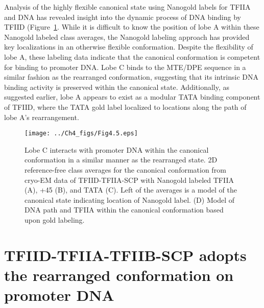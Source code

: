 \indent Analysis of the highly flexible canonical state using Nanogold labels for TFIIA and DNA has revealed insight into the dynamic process of DNA binding by TFIID (Figure~\ref{fig:Fig4.5}.  While it is difficult to know the position of lobe A within these Nanogold labeled class averages, the Nanogold labeling approach has provided key localizations in an otherwise flexible conformation. Despite the flexibility of lobe A, these labeling data indicate that the canonical conformation is competent for binding to promoter DNA. Lobe C binds to the MTE/DPE sequence in a similar fashion as the rearranged conformation, suggesting that its intrinsic DNA binding activity is preserved within the canonical state. Additionally, as suggested earlier, lobe A appears to exist as a modular TATA binding component of TFIID, where the TATA gold label localized to locations along the path of lobe A's rearrangement.\\ 
\begin{figure}
\centering
\texttt{[image: ../Ch4\_figs/Fig4.5.eps]}
\caption[Lobe C interacts with promoter DNA within the canonical conformation in a similar manner as the rearranged state]{Lobe C interacts with promoter DNA within the canonical conformation in a similar manner as the rearranged state. 2D reference-free class averages for the canonical conformation from cryo-EM data of TFIID-TFIIA-SCP with Nanogold labeled TFIIA (A), +45 (B), and TATA (C). Left of the averages is a model of the canonical state indicating location of Nanogold label. (D) Model of DNA path and TFIIA within the canonical conformation based upon gold labeling.}
\label{fig:Fig4.5}
\end{figure}

\section{TFIID-TFIIA-TFIIB-SCP adopts the rearranged conformation on promoter DNA}

